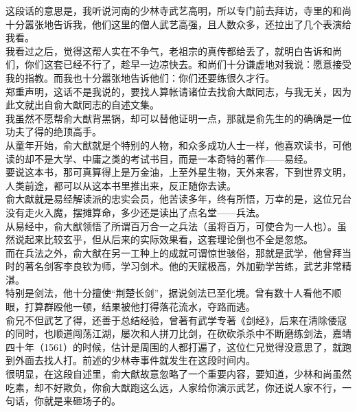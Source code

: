 \begin{multicols}{\theparacolNo}
这段话的意思是，我听说河南的少林寺武艺高明，所以专门前去拜访，寺里的和尚十分嚣张地告诉我，他们这里的僧人武艺高强，且人数众多，还拉出了几个表演给我看。\\

我看过之后，觉得这帮人实在不争气，老祖宗的真传都给丢了，就明白告诉和尚们，你们这套已经不行了，趁早一边凉快去。和尚们十分谦虚地对我说：愿意接受我的指教。而我也十分嚣张地告诉他们：你们还要练很久才行。\\

郑重声明，这话不是我说的，要找人算帐请诸位去找俞大猷同志，与我无关，因为此文就出自俞大猷同志的自述文集。\\

我虽然不愿帮俞大猷背黑锅，却可以替他证明一点，那就是俞先生的的确确是一位功夫了得的绝顶高手。\\

从童年开始，俞大猷就是个特别的人物，和众多成功人士一样，他喜欢读书，可他读的却不是大学、中庸之类的考试书目，而是一本奇特的著作——易经。\\

要说这本书，那可真算得上是万金油，上至外星生物，天外来客，下到世界文明，人类前途，都可以从这本书里推出来，反正随你去读。\\

俞大猷就是易经解读派的忠实会员，他苦读多年，终有所悟，万幸的是，这位兄台没有走火入魔，摆摊算命，多少还是读出了点名堂——兵法。\\

从易经中，俞大猷领悟了所谓百万合一之兵法（虽将百万，可使合为一人也）。虽然说起来比较玄乎，但从后来的实际效果看，这套理论倒也不全是忽悠。\\

而在兵法之外，俞大猷在另一工种上的成就可谓惊世骇俗，那就是武学，他曾拜当时的著名剑客李良钦为师，学习剑术。他的天赋极高，外加勤学苦练，武艺非常精湛。\\

特别是剑法，他十分擅使“荆楚长剑”，据说剑法已至化境。曾有数十人看他不顺眼，打算群殴他一顿，结果被他打得落花流水，夺路而逃。\\

俞兄不但武艺了得，还善于总结经验，曾著有武学专著《剑经》，后来在清除倭寇的同时，也顺道闯荡江湖，屡次和人拼刀比剑，在砍砍杀杀中不断磨练剑法，嘉靖四十年（1561）的时候，估计是周围的人都打遍了，这位仁兄觉得没意思了，就跑到外面去找人打。前述的少林寺事件就发生在这段时间内。\\

很明显，在这段自述里，俞大猷故意忽略了一个重要内容，要知道，少林和尚虽然吃素，却不好欺负，你俞大猷跑这么远，人家给你演示武艺，你还说人家不行，一句话，你就是来砸场子的。\\


\end{multicols}
